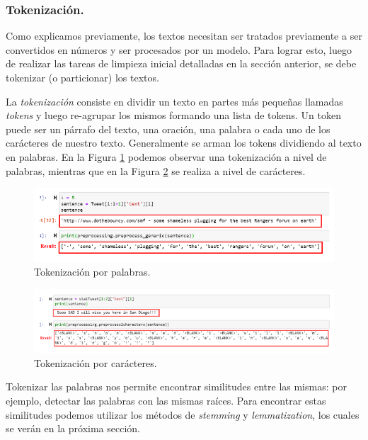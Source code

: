 \documentclass[12pt,a4paper]{article}
\begin{document}
\begin{sloppypar}
\begin{enumerate}
\end{enumerate}

\cleardoublepage

\subsubsection{Tokenización.}\label{tokenizacion}

Como explicamos previamente, los textos necesitan ser tratados previamente a ser convertidos en números y ser procesados por un modelo. Para lograr esto, luego de realizar las tareas de limpieza inicial detalladas en la sección anterior, se debe tokenizar (o particionar) los textos. 

La \textit{tokenización} consiste en dividir un texto en partes más pequeñas llamadas \textit{tokens} y luego re-agrupar los mismos formando una lista de tokens. Un token puede ser un párrafo del texto, una oración, una palabra o cada uno de los carácteres de nuestro texto. Generalmente se arman los tokens dividiendo al texto en palabras. En la Figura \ref{fig:Imagen_NLP_2} podemos observar una tokenización a nivel de palabras, mientras que en la Figura \ref{fig:Imagen_NLP_3} se realiza a nivel de carácteres. 

\begin{figure}[H]    
 \centering
 \includegraphics[width=1\textwidth]{images/NLP/2.png}
 \caption{Tokenización por palabras\cite{NLP_2}.}
 \label{fig:Imagen_NLP_2}
\end{figure}

\begin{figure}[H]    
 \centering
 \includegraphics[width=1\textwidth]{images/NLP/3.png}
 \caption{Tokenización por carácteres\cite{NLP_2}.}
 \label{fig:Imagen_NLP_3}
\end{figure}

Tokenizar las palabras nos permite encontrar similitudes entre las mismas: por ejemplo, detectar las palabras con las mismas raíces. Para encontrar estas similitudes podemos utilizar los métodos de \textit{stemming} y \textit{lemmatization}, los cuales se verán en la próxima sección.


\end{sloppypar}
\end{document}
